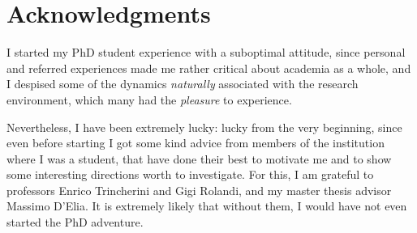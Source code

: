 
\cleardoublepage
{}
{}

\chapter*{Acknowledgments}
%
	{}
\thispagestyle{empty}



\vspace{5pt}

I started my PhD student experience with a suboptimal attitude, since personal
and referred experiences made me rather critical about academia as a whole, and
I despised some of the dynamics \textit{naturally} associated with the research
environment, which many had the \textit{pleasure} to experience.

Nevertheless, I have been extremely lucky: lucky from the very beginning, since
even before starting I got some kind advice from members of the institution
where I was a student, that have done their best to motivate me and to show
some interesting directions worth to investigate.
For this, I am grateful to professors Enrico Trincherini and Gigi Rolandi, and
my master thesis advisor Massimo D'Elia. 
It is extremely likely that without them, I would have not even started the PhD
adventure.

